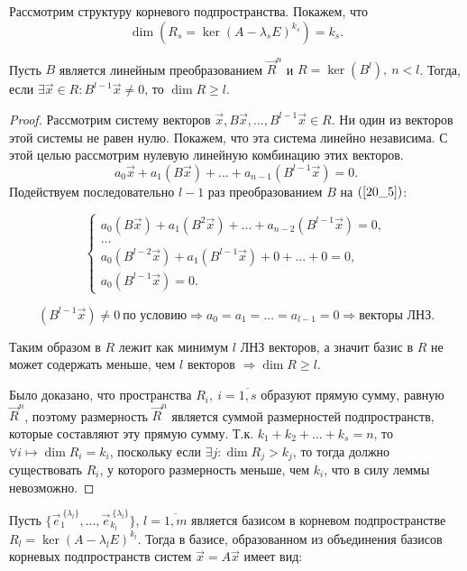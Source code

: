Рассмотрим структуру корневого подпространства. Покажем, что 
\[\dim(R_s = \ker(A - \lambda_s E)^{k_s}) = k_s.\]

\begin{lemma}\label{lemma-20_1}
	Пусть $B$ является линейным преобразованием $\vec{R}^n$ и $R = \ker(B^l),~ n < l$. Тогда, если $\exists \vec{x} \in R: B^{l-1} \vec{x} \neq 0$, то $\dim R \geqslant l$.
	\begin{proof}
		Рассмотрим систему векторов $\vec{x}, B\vec{x}, ..., B^{l-1} \vec{x} \in R$. Ни один из векторов этой системы не равен нулю. Покажем, что эта система линейно независима. С этой целью рассмотрим нулевую линейную комбинацию этих векторов.
		\begin{equation}
			a_0 \vec{x} + a_1(B \vec{x}) + ... + a_{n-1}(B^{l-1} \vec{x}) = 0.
			\label{20_5}
		\end{equation}
		Подействуем последовательно $l - 1$ раз преобразованием $B$ на $(\ref{20_5})$:
		
		\begin{equation*}
			\begin{cases}
				a_0(B \vec{x}) + a_1 (B^2 \vec{x}) + ... + a_{n-2}(B^{l-1} \vec{x}) = 0, \\
				... \\
				a_0(B^{l-2} \vec{x}) + a_1(B^{l-1} \vec{x}) + 0 + ... + 0 = 0, \\
				a_0 (B^{l-1} \vec{x}) = 0.
			\end{cases}
		\end{equation*}
		
		\[(B^{l-1} \vec{x}) \neq 0 ~\text{по условию} \Rightarrow a_0 = a_1 = ... = a_{l-1} = 0 \Rightarrow \text{векторы ЛНЗ.}\]
		
		Таким образом в $R$ лежит как минимум $l$ ЛНЗ векторов, а значит базис в $R$ не может содержать меньше, чем $l$ векторов $\Rightarrow \dim R \geqslant l$.
		
		Было доказано, что пространства $R_i,~ i = \overline{1,s}$ образуют прямую сумму, равную $\vec{R}^n$, поэтому размерность $\vec{R}^n$ является суммой размерностей подпространств, которые составляют эту прямую сумму. Т.к. $k_1 + k_2 + ... + k_s = n$, то $\forall i \longmapsto \dim R_i = k_i$, поскольку если $\exists j: \dim R_j > k_j$, то тогда должно существовать $R_i$, у которого размерность меньше, чем $k_i$, что в силу леммы невозможно.
	\end{proof}
\end{lemma}

Пусть $\{\vec{e}_1^{\: \{\lambda_l\}}, ... , \vec{e}_{k_l}^{\: \{\lambda_l\}}\}$, $l = \overline{1,m}$ является базисом в корневом подпространстве $R_l = \ker (A - \lambda_l E)^{k_l}$. Тогда в базисе, образованном из объединения базисов корневых подпространств систем $\vec{x} = A \vec{x}$ имеет вид:

